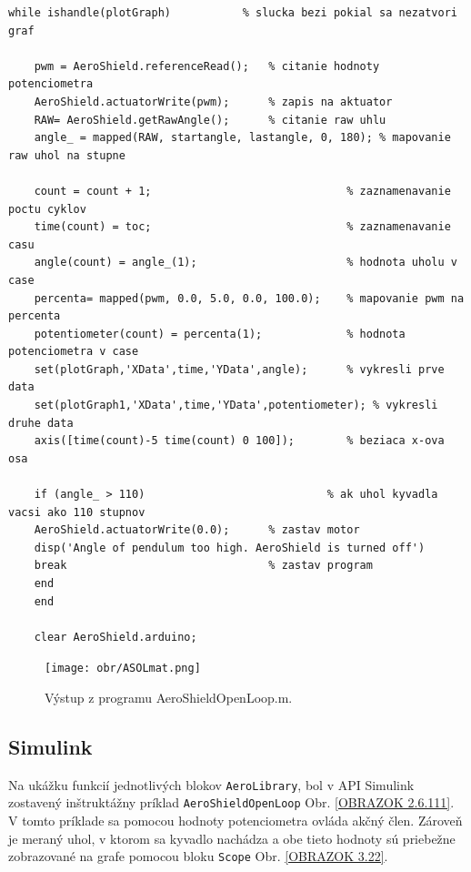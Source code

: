 \begin{lstlisting}[caption={AeroShield open loop, while cyklus.},captionpos=b]
	while ishandle(plotGraph)           % slucka bezi pokial sa nezatvori graf
	
	pwm = AeroShield.referenceRead();   % citanie hodnoty potenciometra
	AeroShield.actuatorWrite(pwm);      % zapis na aktuator
	RAW= AeroShield.getRawAngle();      % citanie raw uhlu
	angle_ = mapped(RAW, startangle, lastangle, 0, 180); % mapovanie raw uhol na stupne
	
	count = count + 1;                              % zaznamenavanie poctu cyklov
	time(count) = toc;                              % zaznamenavanie casu
	angle(count) = angle_(1);                       % hodnota uholu v case 
	percenta= mapped(pwm, 0.0, 5.0, 0.0, 100.0);    % mapovanie pwm na percenta
	potentiometer(count) = percenta(1);             % hodnota potenciometra v case
	set(plotGraph,'XData',time,'YData',angle);      % vykresli prve data
	set(plotGraph1,'XData',time,'YData',potentiometer); % vykresli druhe data  
	axis([time(count)-5 time(count) 0 100]);        % beziaca x-ova osa
	
	if (angle_ > 110)                            % ak uhol kyvadla vacsi ako 110 stupnov 
	AeroShield.actuatorWrite(0.0);      % zastav motor  
	disp('Angle of pendulum too high. AeroShield is turned off')
	break                               % zastav program
	end
	end  
	
	clear AeroShield.arduino;           
\end{lstlisting}

\begin{figure}[!tbh]
	\centering
	\texttt{[image: obr/ASOLmat.png]}
	\caption{Výstup z programu AeroShieldOpenLoop.m.}\label{OBRAZOK 3.2}
\end{figure}

\subsection{Simulink}


Na ukážku funkcií jednotlivých blokov \verb|AeroLibrary|, bol v API Simulink zostavený inštruktážny príklad \verb|AeroShieldOpenLoop| Obr. \ref{OBRAZOK 2.6.111}. V tomto príklade sa pomocou hodnoty potenciometra ovláda akčný člen. Zároveň je meraný uhol, v ktorom sa kyvadlo nachádza a obe tieto hodnoty sú priebežne zobrazované na grafe pomocou bloku \verb|Scope| Obr. \ref{OBRAZOK 3.22}. 

